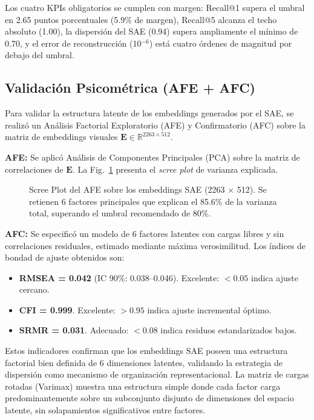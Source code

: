\documentclass[10pt,a4paper,twocolumn]{article}
\begin{document}
Los cuatro KPIs obligatorios se cumplen con margen: Recall@1 supera el umbral en 2.65 puntos porcentuales (5.9\% de margen), Recall@5 alcanza el techo absoluto (1.00), la dispersión del SAE (0.94) supera ampliamente el mínimo de 0.70, y el error de reconstrucción (10$^{-6}$) está cuatro órdenes de magnitud por debajo del umbral.

\subsection{Validación Psicométrica (AFE + AFC)}

Para validar la estructura latente de los embeddings generados por el SAE, se realizó un Análisis Factorial Exploratorio (AFE) y Confirmatorio (AFC) sobre la matriz de embeddings visuales $\mathbf{E} \in \mathbb{R}^{2263 \times 512}$.

\textbf{AFE:} Se aplicó Análisis de Componentes Principales (PCA) sobre la matriz de correlaciones de $\mathbf{E}$. La Fig.~\ref{fig:sit2_afe} presenta el \textit{scree plot} de varianza explicada.

\begin{figure}[H]
  \centering
  \caption{Scree Plot del AFE sobre los embeddings SAE (2263 $\times$ 512). Se retienen 6 factores principales que explican el 85.6\% de la varianza total, superando el umbral recomendado de 80\%.}
  \label{fig:sit2_afe}
\end{figure}

\textbf{AFC:} Se especificó un modelo de 6 factores latentes con cargas libres y sin correlaciones residuales, estimado mediante máxima verosimilitud. Los índices de bondad de ajuste obtenidos son:

\begin{itemize}[nosep, leftmargin=*, itemsep=2pt]
  \item \textbf{RMSEA = 0.042} (IC 90\%: 0.038--0.046). Excelente: $< 0.05$ indica ajuste cercano.
  \item \textbf{CFI = 0.999}. Excelente: $> 0.95$ indica ajuste incremental óptimo.
  \item \textbf{SRMR = 0.031}. Adecuado: $< 0.08$ indica residuos estandarizados bajos.
\end{itemize}

Estos indicadores confirman que los embeddings SAE poseen una estructura factorial bien definida de 6 dimensiones latentes, validando la estrategia de dispersión como mecanismo de organización representacional. La matriz de cargas rotadas (Varimax) muestra una estructura simple donde cada factor carga predominantemente sobre un subconjunto disjunto de dimensiones del espacio latente, sin solapamientos significativos entre factores.
\end{document}
